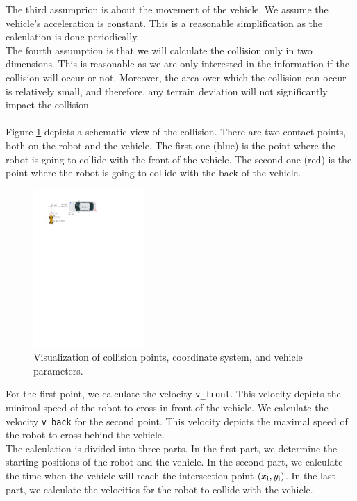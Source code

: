         The third assumprion is about the movement of the vehicle. We assume the vehicle's acceleration is constant. This is a reasonable simplification as the calculation is done periodically.\\
        The fourth assumption is that we will calculate the collision only in two dimensions. This is reasonable as we are only interested in the information if the collision will occur or not. Moreover, the area over which the collision can occur is relatively small, and therefore, any terrain deviation will not significantly impact the collision.\\\\
        Figure \ref{fig:collision} depicts a schematic view of the collision. There are two contact points, both on the robot and the vehicle. The first one (blue) is the point where the robot is going to collide with the front of the vehicle. The second one (red) is the point where the robot is going to collide with the back of the vehicle.\\
        \begin{figure}[ht]
            \centering
            \includegraphics[height=6cm]{images/collision.pdf}
            \caption{Visualization of collision points, coordinate system, and vehicle parameters.}
            \label{fig:collision}
        \end{figure}
        \noindent For the first point, we calculate the velocity \texttt{v\_front}. This velocity depicts the minimal speed of the robot to cross in front of the vehicle. We calculate the velocity \texttt{v\_back} for the second point. This velocity depicts the maximal speed of the robot to cross behind the vehicle.\\
        The calculation is divided into three parts. In the first part, we determine the starting positions of the robot and the vehicle. In the second part, we calculate the time when the vehicle will reach the intersection point $(x_{\rm{i}}, y_{\rm{i}})$. In the last part, we calculate the velocities for the robot to collide with the vehicle.\\\\
